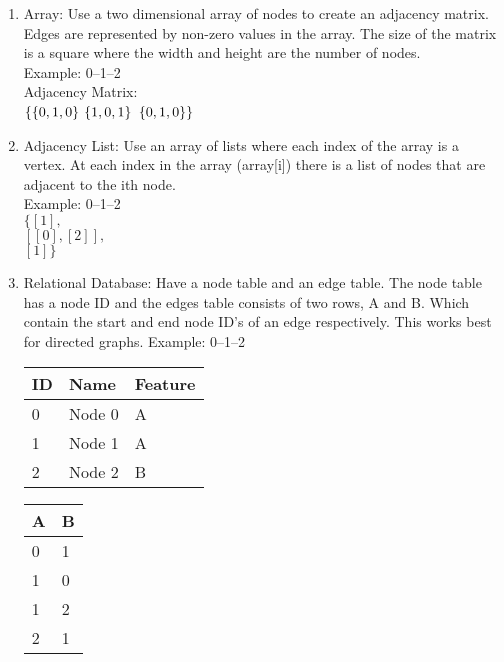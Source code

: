 \documentclass{article}
\begin{document}
\begin{enumerate}
	\item Array: Use a two dimensional array of nodes to create an adjacency matrix. Edges are represented by non-zero values in the array. The size of the matrix is a square where the width and height are the number of nodes. \\
	Example: 0--1--2\\
	Adjacency Matrix:\\
	$\{\{0, 1, 0\}\\$
	$\{1, 0, 1\}\\$
	$\{0, 1, 0\}\}\\$

	\item Adjacency List: Use an array of lists where each index of the array is a vertex. At each index in the array (array[i]) there is a list of nodes that are adjacent to the ith node. \\
	Example: 0--1--2\\
	$\{[1],$\\
	$[[0],[2]],$\\
	$[1]\}$\\

	\item Relational Database: Have a node table and an edge table. The node table has a node ID and the edges table consists of two rows, A and B. Which contain the start and end node ID's of an edge respectively. This works best for directed graphs.
	Example: 0--1--2\\

	\begin{table}[H]
		\begin{tabular}{|l|l|l|}
			\hline
			ID & Name   & Feature \\ \hline
			0  & Node 0 & A       \\ \hline
			1  & Node 1 & A       \\ \hline
			2  & Node 2 & B       \\ \hline
		\end{tabular}
	\end{table}
	\begin{table}[H]
		\begin{tabular}{|l|l|}
			\hline
			A & B \\ \hline
			0 & 1 \\ \hline
			1 & 0 \\ \hline
			1 & 2 \\ \hline
			2 & 1 \\ \hline
		\end{tabular}
	\end{table}
\end{enumerate}
\end{document}
